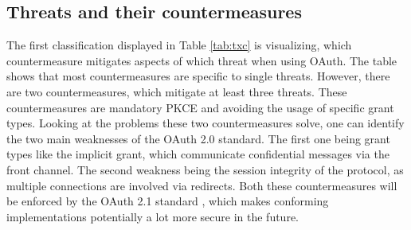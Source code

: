 \documentclass[
    fontsize=12pt,
    headings=small,
    parskip=half,           %
    bibliography=totoc,
    numbers=noenddot,       %
    open=any,               %
    ]{scrreprt}
\begin{document}
\subsection{Threats and their countermeasures}

The first classification displayed in Table \ref{tab:txc} is visualizing, which countermeasure mitigates aspects of which threat when using OAuth. The table shows that most countermeasures are specific to single threats. However, there are two countermeasures, which mitigate at least three threats. These countermeasures are mandatory PKCE and avoiding the usage of specific grant types. Looking at the problems these two countermeasures solve, one can identify the two main weaknesses of the OAuth 2.0 standard. The first one being grant types like the implicit grant, which communicate confidential messages via the front channel. The second weakness being the session integrity of the protocol, as multiple connections are involved via redirects. Both these countermeasures will be enforced by the OAuth 2.1 standard \cite{hardt2023rfc}, which makes conforming implementations potentially a lot more secure in the future.
\end{document}

